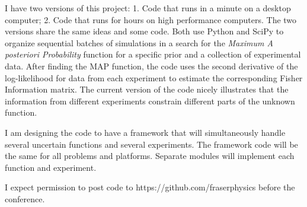\documentclass[11pt]{article}
\begin{document}
I have two versions of this project: 1. Code that runs in a minute on
a desktop computer; 2. Code that runs for hours on high performance
computers.  The two versions share the same ideas and some code.  Both
use Python and SciPy to organize sequential batches of simulations in
a search for the \emph{Maximum A posteriori Probability} function for a
specific prior and a collection of experimental data.  After finding
the MAP function, the code uses the second derivative of the
log-likelihood for data from each experiment to estimate the
corresponding Fisher Information matrix.  The current version of the
code nicely illustrates that the information from different
experiments constrain different parts of the unknown function.

I am designing the code to have a framework that will simultaneously
handle several uncertain functions and several experiments.  The
framework code will be the same for all problems and platforms.
Separate modules will implement each function and experiment.

I expect permission to post code to https://github.com/fraserphysics
before the conference.
\end{document}
